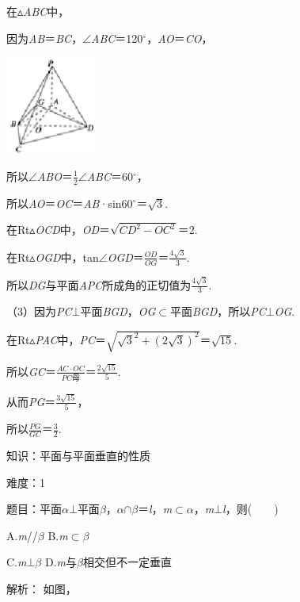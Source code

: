 \documentclass{article} %
\begin{document}
在$\mathrm{\vartriangle}$\textit{ABC}中，

因为\textit{AB}＝\textit{BC}，$\mathrm{\angle}$\textit{ABC}＝120$\mathrm{{}^\circ}$，\textit{AO}＝\textit{CO}，

\includegraphics*[width=1.18in, height=1.27in, keepaspectratio=false]{image248}

所以$\mathrm{\angle}$\textit{ABO}＝$\frac{1}{2}\mathrm{\angle}$\textit{ABC}＝60$\mathrm{{}^\circ}$，

所以\textit{AO}＝\textit{OC}＝\textit{AB}·sin60$\mathrm{{}^\circ}$＝$\sqrt{3}$.

在Rt$\mathrm{\vartriangle}$\textit{OCD}中，\textit{OD}＝$\sqrt{CD^2-OC^2}$＝2.

在Rt$\mathrm{\vartriangle}$\textit{OGD}中，tan$\mathrm{\angle}$\textit{OGD}＝$\frac{OD}{OG}$＝$\frac{4\sqrt{3}}{3}$.

所以\textit{DG}与平面\textit{APC}所成角的正切值为$\frac{4\sqrt{3}}{3}$.

（3）因为\textit{PC}$\mathrm{\bot}$平面\textit{BGD}，\textit{OG}$\mathrm{\subset }$平面\textit{BGD}，所以\textit{PC}$\mathrm{\bot}$\textit{OG}.

在Rt$\mathrm{\vartriangle}$\textit{PAC}中，\textit{PC}＝$\sqrt{\sqrt{3}^2+(2\sqrt{3})^2}$＝$\sqrt{15}$.

所以\textit{GC}＝$\frac{AC\cdot OC}{PC母}$＝$\frac{2\sqrt{15}}{5}$.

从而\textit{PG}＝$\frac{3\sqrt{15}}{5}$，

所以$\frac{PG}{GC}$＝$\frac{3}{2}$.

知识：平面与平面垂直的性质

难度：1

题目：平面\textit{$\alpha$}$\mathrm{\bot}$平面\textit{$\beta$}，\textit{$\alpha$}$\mathrm{\cap}$\textit{$\beta$}＝\textit{l}，\textit{m}$\mathrm{\subset }$\textit{$\alpha$}，\textit{m}$\mathrm{\bot}$\textit{l}，则(　　)

A.\textit{m}//\textit{$\beta$  }B.\textit{m}$\mathrm{\subset }$\textit{$\beta$}

C.\textit{m}$\mathrm{\bot}$\textit{$\beta$  }D.\textit{m}与\textit{$\beta$}相交但不一定垂直

解析：
如图，
\end{document}
